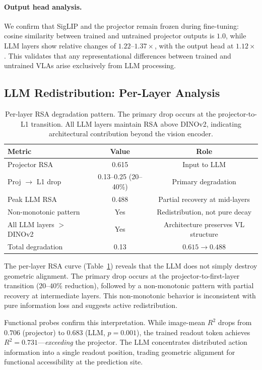 \documentclass[letterpaper]{article}
\begin{document}
\paragraph{Output head analysis.}
We confirm that SigLIP and the projector remain frozen during fine-tuning: cosine similarity between trained and untrained projector outputs is $1.0$, while LLM layers show relative changes of $1.22$--$1.37\times$, with the output head at $1.12\times$. This validates that any representational differences between trained and untrained VLAs arise exclusively from LLM processing.

\subsection{LLM Redistribution: Per-Layer Analysis}
\label{sec:exp-redistribution}

\begin{table}[t]
\centering
\caption{Per-layer RSA degradation pattern. The primary drop occurs at the projector-to-L1 transition. All LLM layers maintain RSA above DINOv2, indicating architectural contribution beyond the vision encoder.}
\label{tab:perlayer}
\begin{tabular}{lcc}
\toprule
\textbf{Metric} & \textbf{Value} & \textbf{Role} \\
\midrule
Projector RSA & 0.615 & Input to LLM \\
Proj $\to$ L1 drop & 0.13--0.25 (20--40\%) & Primary degradation \\
Peak LLM RSA & 0.488 & Partial recovery at mid-layers \\
Non-monotonic pattern & Yes & Redistribution, not pure decay \\
All LLM layers $>$ DINOv2 & Yes & Architecture preserves VL structure \\
\midrule
Total degradation & 0.13 & $0.615 \to 0.488$ \\
\bottomrule
\end{tabular}
\end{table}

The per-layer RSA curve (Table~\ref{tab:perlayer}) reveals that the LLM does not simply destroy geometric alignment. The primary drop occurs at the projector-to-first-layer transition ($20$--$40\%$ reduction), followed by a non-monotonic pattern with partial recovery at intermediate layers. This non-monotonic behavior is inconsistent with pure information loss and suggests active redistribution.

Functional probes confirm this interpretation. While image-mean $R^2$ drops from $0.706$ (projector) to $0.683$ (LLM, $p{=}0.001$), the trained readout token achieves $R^2{=}0.731$---\emph{exceeding} the projector. The LLM concentrates distributed action information into a single readout position, trading geometric alignment for functional accessibility at the prediction site.
\end{document}
